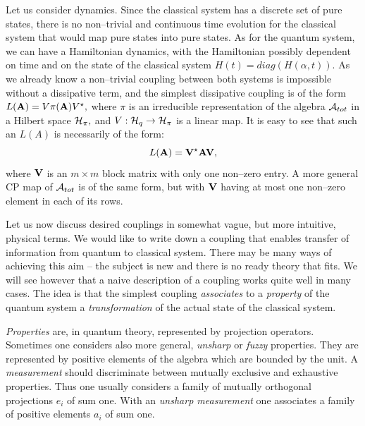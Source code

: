 \documentclass[12pt]{article}
\begin{document}
Let us consider dynamics.  Since the classical system has a discrete
set of pure states,  there is no non--trivial and continuous  time
evolution for the
classical system that would map pure states into pure states. 
 As for the quantum system,  we can have a Hamiltonian dynamics,  with
the Hamiltonian possibly dependent on time and on the state of the 
classical
system $H (t) = diag (H (\alpha, t)) . $ As we already know a non--trivial
coupling between both systems is impossible without a dissipative
term,  and the simplest dissipative coupling is of the form
$L ({\bf A})=V\pi ({\bf A})V^\star , $ where $\pi$ is an irreducible
representation of the algebra ${\cal A}_{tot}$ in a Hilbert space
${\cal H}_\pi , $ and $V: {\cal H}_q\rightarrow{\cal H}_\pi$ is a linear
map.  It is easy to see that such an $L (A)$ is necessarily of the form: 
$$L ({\bf A})={\bf V}^\star {\bf A} {\bf V} , $$
where ${\bf V}$ is an $m\times m$ block matrix with only one non--zero
entry.  A more general CP map of ${\cal A}_{tot}$ is of the same form, 
but with ${\bf V}$ having at most one non--zero element in each of its
rows.

Let us now discuss   desired couplings in somewhat vague,  but more
intuitive,  physical terms.  We would like to write down a coupling that
enables transfer of information from quantum to classical system. 
There may be many ways of achieving this aim -- the subject is new and
there is no ready theory that fits.
We will see however that a naive
description of a coupling works quite well in many cases.  The idea is 
that the simplest coupling {\em associates} to a {\em property} of the
quantum system a {\em transformation} of the actual state of the
classical system. 

{\em Properties} are,  in quantum theory,  represented by projection
operators.  Sometimes one considers also more general,  {\em unsharp} or
{\em fuzzy} properties.  They are represented by positive elements of
the algebra which are bounded by the unit. A {\em measurement} should
discriminate between mutually exclusive and exhaustive properties. 
Thus one usually considers a family of mutually orthogonal projections
$e_i$ of sum one.  With an {\em unsharp measurement} one associates 
a family
of positive elements $a_i$ of sum one.
\end{document}
